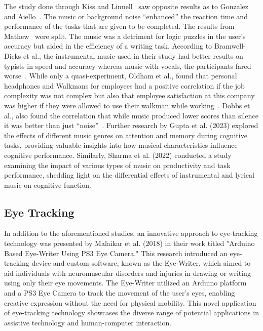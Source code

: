 \documentclass[manuscript, screen, review]{acmart} %
\begin{document}
The study done through Kiss and Linnell~\cite{kiss2021effect} saw opposite results as to Gonzalez and Aiello~\cite{Gonzalez_Aiello_2019}. The music or background noise ``enhanced'' the reaction time and performance of the tasks that are given to be completed. 
The results from Mathew~\cite{mathew2022inherently} were split. 
The music was a detriment for logic puzzles in the user's accuracy but aided in the efficiency of a writing task. 
According to Bramwell-Dicks et al., the instrumental music used in their study had better results on typists in speed and accuracy whereas music with vocals, the participants fared worse~\cite{bramwell2016can}.
While only a quasi-experiment, Oldham et al., found that personal headphones and Walkmans for employees had a positive correlation if the job complexity was not complex but also that employee satisfaction at this company was higher if they were allowed to use their walkman while working~\cite{oldhamListen}. Dobbs et al., also found the correlation that while music produced lower scores than silence it was better than just ``noise''~\cite{effectsOfBackgroundDobbs}.
Further research by \cite{gupta2023effect}Gupta et al. (2023) explored the effects of different music genres on attention and memory during cognitive tasks, providing valuable insights into how musical characteristics influence cognitive performance. Similarly, Sharma et al. \cite{sharma2022impact}(2022) conducted a study examining the impact of various types of music on productivity and task performance, shedding light on the differential effects of instrumental and lyrical music on cognitive function.

\subsection{Eye Tracking}
In addition to the aforementioned studies, an innovative approach to eye-tracking technology was presented by \cite{Malaikar2018Arduino}Malaikar et al. (2018) in their work titled "Arduino Based Eye-Writer Using PS3 Eye Camera." This research introduced an eye-tracking device and custom software, known as the Eye-Writer, which aimed to aid individuals with neuromuscular disorders and injuries in drawing or writing using only their eye movements. The Eye-Writer utilized an Arduino platform and a PS3 Eye Camera to track the movement of the user's eyes, enabling creative expression without the need for physical mobility. This novel application of eye-tracking technology showcases the diverse range of potential applications in assistive technology and human-computer interaction.
\end{document}
